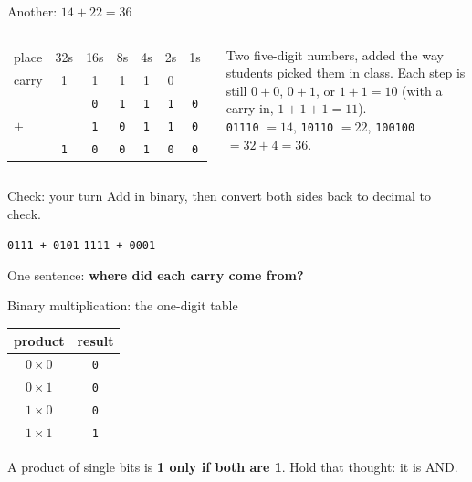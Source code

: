 \documentclass[aspectratio=169,10pt]{beamer}
\newcommand{\gc}[1]{\textcolor{black!60}{\footnotesize #1}}
\begin{document}
\begin{frame}{Another: $14+22=36$}
\begin{columns}[c]
\begin{center}{\LARGE
\begin{tabular}{@{}l@{\ \ }c@{\ \ }c@{\ \ }c@{\ \ }c@{\ \ }c@{\ \ }c@{}}
\gc{place} & \gc{32s} & \gc{16s} & \gc{8s} & \gc{4s} & \gc{2s} & \gc{1s}\\
\gc{carry} & \gc{1} & \gc{1} & \gc{1} & \gc{1} & \gc{0} & \\
 & & \texttt{0} & \texttt{1} & \texttt{1} & \texttt{1} & \texttt{0}\\
$+$ & & \texttt{1} & \texttt{0} & \texttt{1} & \texttt{1} & \texttt{0}\\\hline
 & \texttt{1} & \texttt{0} & \texttt{0} & \texttt{1} & \texttt{0} & \texttt{0}
\end{tabular}}\end{center}
\small
Two five-digit numbers, added the way students picked them in class. Each step is still $0+0$, $0+1$, or $1+1=10$ (with a carry in, $1+1+1=11$).\\[4pt]
\texttt{01110} $=14$, \texttt{10110} $=22$, \texttt{100100} $=32+4=36$.
\end{columns}
\end{frame}

\begin{frame}{Check: your turn}
Add in binary, then convert both sides back to decimal to check.
\begin{center}
\texttt{0111 + 0101} \qquad\qquad \texttt{1111 + 0001}
\end{center}
One sentence: \textbf{where did each carry come from?}
\end{frame}

\begin{frame}{Binary multiplication: the one-digit table}
\begin{center}
\begin{tabular}{c|c}
\textbf{product} & \textbf{result}\\\hline
$0\times0$ & \texttt{0}\\
$0\times1$ & \texttt{0}\\
$1\times0$ & \texttt{0}\\
$1\times1$ & \texttt{1}
\end{tabular}
\end{center}
A product of single bits is \textbf{1 only if both are 1}. Hold that thought: it is AND.
\end{frame}
\end{document}
